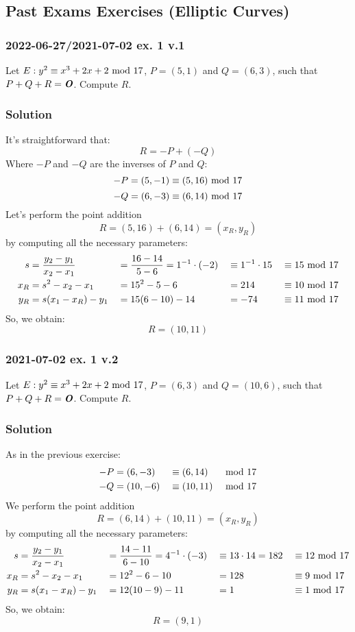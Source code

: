 \newpage
\subsection{Past Exams Exercises (Elliptic Curves)}
\subsubsection{2022-06-27/2021-07-02 ex. 1 v.1}
Let $E:y^2\equiv x^3+2x+2\text{ mod } 17$, $P=(5,1)$ and $Q=(6,3)$, such that $P+Q+R=\text{\textbf{\textit{O}}}$. Compute $R$.
\subsubsection*{Solution}
It's straightforward that:
$$R=-P+(-Q)$$
Where $-P$ and $-Q$ are the inverses of $P$ and $Q$:
$$-P=(5, -1)\equiv(5,16)\text{ mod }17$$
$$-Q=(6,-3)\equiv(6,14)\text{ mod }17$$
Let's perform the point addition
$$R=(5,16)+(6,14)=(x_R,y_R)$$
by computing all the necessary parameters:
\begin{alignat*}{4}
    s&=\dfrac{y_2-y_1}{x_2-x_1}&&=\dfrac{16-14}{5-6}=1^{-1}\cdot (-2)&&\equiv 1^{-1}\cdot 15&&\equiv15\text{ mod }17\\
    x_R&=s^2-x_2-x_1&&=15^2-5-6&&=214&&\equiv10\text{ mod }17\\
    y_R&=s(x_1-x_R)-y_1&&=15(6-10)-14&&=-74&&\equiv11\text{ mod }17
\end{alignat*}
So, we obtain:
$$R=(10,11)$$

\subsubsection{2021-07-02 ex. 1 v.2}
Let $E:y^2\equiv x^3+2x+2\text{ mod } 17$, $P=(6,3)$ and $Q=(10,6)$, such that $P+Q+R=\text{\textbf{\textit{O}}}$. Compute $R$.
\subsubsection*{Solution}
As in the previous exercise:
\begin{alignat*}{3}
    -P&=(6,-3)&&\equiv(6,14)&&\text{ mod }17\\
    -Q&=(10,-6)&&\equiv(10,11)&&\text{ mod }17
\end{alignat*}
We perform the point addition
$$R=(6,14)+(10,11)=(x_R,y_R)$$
by computing all the necessary parameters:
\begin{alignat*}{4}
    s&=\dfrac{y_2-y_1}{x_2-x_1}&&=\dfrac{14-11}{6-10}=4^{-1}\cdot (-3)&&\equiv 13\cdot 14=182&&\equiv12\text{ mod }17\\
    x_R&=s^2-x_2-x_1&&=12^2-6-10&&=128&&\equiv9\text{ mod }17\\
    y_R&=s(x_1-x_R)-y_1&&=12(10-9)-11&&=1&&\equiv1\text{ mod }17
\end{alignat*}
So, we obtain:
$$R=(9,1)$$

